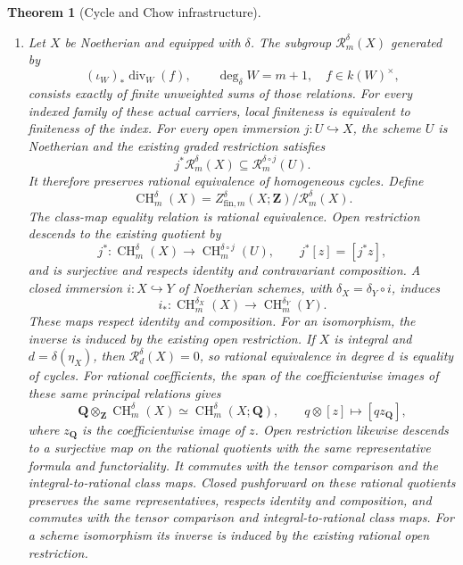 \documentclass[11pt]{article}
\newtheorem{theorem}{Theorem}[section]
\theoremstyle{definition}
\theoremstyle{remark}
\begin{document}
\begin{theorem}[Cycle and Chow infrastructure]
\begin{enumerate}[label=\textup{(\roman*)},leftmargin=*]
\item
Let \(X\) be Noetherian and equipped with \(\delta\).
The subgroup \(\mathcal R_m^\delta(X)\) generated by
\[
  (\iota_W)_*\operatorname{div}_W(f),\qquad
  \deg_\delta W=m+1,\quad f\in k(W)^\times,
\]
consists exactly of finite unweighted sums of those relations.
For every indexed family of these actual carriers, local finiteness
is equivalent to finiteness of the index.
For every open immersion \(j:U\hookrightarrow X\), the scheme
\(U\) is Noetherian and the existing graded restriction satisfies
\[
 j^*\mathcal R_m^\delta(X)
       \subseteq\mathcal R_m^{\delta\circ j}(U).
\]
It therefore preserves rational equivalence of homogeneous cycles.
Define
\[
  \operatorname{CH}_m^\delta(X)
    =Z^\delta_{\mathrm{fin},m}(X;\mathbf Z)/
        \mathcal R_m^\delta(X).
\]
The class-map equality relation is rational equivalence. Open restriction
descends to the existing quotient by
\[
 j^*:\operatorname{CH}_m^\delta(X)
       \longrightarrow\operatorname{CH}_m^{\delta\circ j}(U),
 \qquad j^*[z]=[j^*z],
\]
and is surjective and respects identity and contravariant composition.
A closed immersion \(i:X\hookrightarrow Y\) of Noetherian schemes,
with \(\delta_X=\delta_Y\circ i\), induces
\[
 i_*:\operatorname{CH}_m^{\delta_X}(X)
      \longrightarrow\operatorname{CH}_m^{\delta_Y}(Y).
\]
These maps respect identity and composition.
For an isomorphism, the inverse is induced by the existing
open restriction.
If \(X\) is integral and \(d=\delta(\eta_X)\), then
\(\mathcal R_d^\delta(X)=0\), so rational equivalence in degree
\(d\) is equality of cycles.
For rational coefficients, the span of the coefficientwise images
of these same principal relations gives
\[
 \mathbf Q\otimes_{\mathbf Z}\operatorname{CH}_m^\delta(X)
    \simeq \operatorname{CH}_m^\delta(X;\mathbf Q),
 \qquad q\otimes[z]\longmapsto[qz_{\mathbf Q}],
\]
where \(z_{\mathbf Q}\) is the coefficientwise image of \(z\).
Open restriction likewise descends to a surjective map on the rational
quotients with the same representative formula and functoriality. It commutes with
the tensor comparison and the integral-to-rational class maps.
Closed pushforward on these rational quotients preserves the same
representatives, respects identity and composition, and commutes
with the tensor comparison and integral-to-rational class maps.
For a scheme isomorphism its inverse is induced by the existing
rational open restriction.


\end{enumerate}
\end{theorem}
\end{document}
